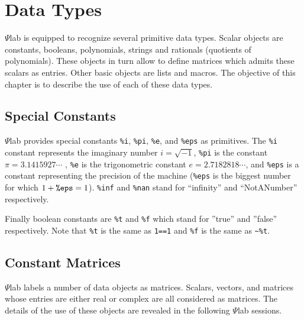 \chapter{Data Types}
\label{ch2}

	$\Psi$lab is equipped to recognize several primitive data types.
 Scalar objects are constants, booleans, polynomials, strings and 
rationals (quotients of polynomials). These objects in turn allow to 
define matrices which admits these scalars as entries.
Other basic objects are lists and macros.
%
The objective of this chapter is to describe the use of each of 
these data types.

\section{Special Constants}
\label{s2.1}

	$\Psi$lab provides special constants {\tt \%i}, {\tt \%pi},
{\tt \%e}, and {\tt \%eps} as primitives.  The {\tt \%i} constant
represents the imaginary number $i=\sqrt{-1}$, {\tt \%pi} is the
constant $\pi=3.1415927\cdots$ , {\tt \%e}
is the trigonometric constant $e=2.7182818\cdots$, and {\tt \%eps}
is a constant representing the precision of the machine ({\tt \%eps}
is the biggest number for which $1+\mbox{\tt \%eps}=1$). {\tt \%inf}
and {\tt \%nan} stand for ``infinity'' and ``NotANumber'' respectively.

Finally boolean constants are {\tt \%t} and {\tt \%f} which stand for
''true'' and ''false'' respectively. Note that {\tt \%t} is the
same as {\tt 1==1} and {\tt \%f} is the same as {\verb!~%t!}.

\section{Constant Matrices}
\label{s2.2}

	$\Psi$lab labels a number of data objects as matrices.  
Scalars, vectors, and matrices whose entries are either real or complex
are all considered as matrices.  The details of the use
of these objects are revealed in the following $\Psi$lab sessions.

